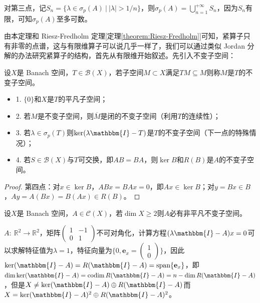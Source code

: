 \begin{remark}
\quad 对第三点，记$S_n=\{\lambda\in\sigma_p(A) \ | \ |\lambda|>1/n\}$，则$\sigma_p(A)=\bigcup\limits_{n=1}^{+\infty}S_n$，因为$S_n$有限，可知$\sigma_p(A)$至多可数。
\end{remark}
由本定理和 Riesz-Fredholm 定理[定理\ref{theorem:Riesz-Fredholm}]可知，紧算子只有非零的点谱，这与有限维算子可以说几乎一样了，我们可以通过类似 Jordan 分解的办法研究紧算子的结构，首先从有限维开始叙述。先引入不变子空间：
\begin{definition}
设$X$是 Banach 空间，$T \in \mathscr{B}(X)$，若子空间$M \subset X$满足$TM \subseteq M$则称$M$是$T$的不变子空间。
\end{definition}
\begin{itemize}
\item 1. $\{0\}$和$X$是$T$的平凡子空间；
\item 2. 若$M$是不变子空间，则$\overline{M}$是闭的不变子空间（利用$T$的连续性）；
\item 3. 若$\lambda \in \sigma_p(T)$则$\ker(\lambda\mathbbm{I}-T)$是$T$的不变子空间（下一点的特殊情况）；
\item 4. 若$S \in \mathscr{B}(X)$与$T$可交换，即$AB=BA$，则$\ker B$和$R(B)$是$A$的不变子空间。
\end{itemize}
\begin{proof}
第四点：对$x \in \ker B$，$ABx=BAx=0$，即$Ax \in \ker B$；对$y=Bx \in B$，$Ay=A(Bx)=B(Ax)\in R(B)$。
\end{proof}

\begin{theorem}
设$X$是 Banach 空间，$A \in \mathscr{C}(X)$，若$\dim X \geq 2$则$A$必有非平凡不变子空间。
\end{theorem}

\begin{example}
\quad $A: \ \mathbb{R}^2 \to \mathbb{R}^2$，矩阵$\begin{pmatrix}1 & -1 \\ 0 & 1 \end{pmatrix}$不可对角化，计算方程$(\lambda\mathbbm{I}-A)x=0$可以求解特征值为$\lambda=1$，特征向量为$\{0,\mathbf{e}_x=\begin{pmatrix}1\\0\end{pmatrix}\}$，因此$\ker(\mathbbm{I}-A)=R(\mathbbm{I}-A)=\text{span}\{\mathbf{e}_x\}$，即$\dim\ker(\mathbbm{I}-A)=\operatorname{codim} R(\mathbbm{I}-A)=n-\dim R(\mathbbm{I}-A)$，但是$X \neq \ker(\mathbbm{I}-A) \oplus R(\mathbbm{I}-A)$而$X=\ker(\mathbbm{I}-A)^2 \oplus R(\mathbbm{I}-A)^2$。
\end{example}

